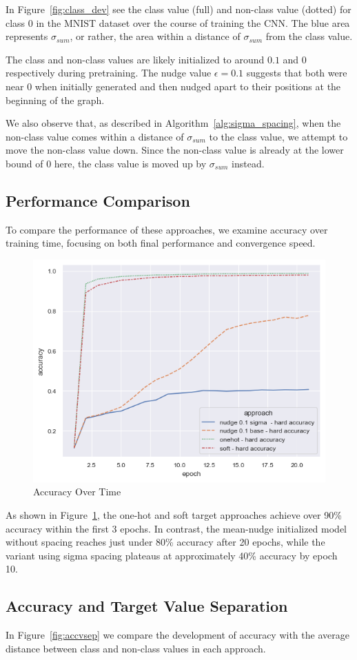 \documentclass[12pt,fleqn,a4paper]{article}
\begin{document}
In Figure~\ref{fig:class_dev} see the class value (full) and non-class value (dotted) for class 0 in the MNIST dataset over the course of training the CNN. The blue area represents $\sigma_{sum}$, or rather, the area within a distance of $\sigma_{sum}$ from the class value. 

The class and non-class values are likely initialized to around $0.1$ and $0$ respectively during pretraining. The nudge value $\epsilon = 0.1$ suggests that both were near $0$ when initially generated and then nudged apart to their positions at the beginning of the graph.

We also observe that, as described in Algorithm~\ref{alg:sigma_spacing}, when the non-class value comes within a distance of $\sigma_{sum}$ to the class value, we attempt to move the non-class value down. Since the non-class value is already at the lower bound of $0$ here, the class value is moved up by  $\sigma_{sum}$ instead.

\subsection{Performance Comparison}
To compare the performance of these approaches, we examine accuracy over training time, focusing on both final performance and convergence speed.
\begin{figure}
    \centering
    \includegraphics[width=0.6\linewidth]{graphs/acc.png}
    \caption{Accuracy Over Time}
    \label{fig:acc}
\end{figure}

As shown in Figure~\ref{fig:acc}, the one-hot and soft target approaches achieve over 90\% accuracy within the first 3 epochs. In contrast, the mean-nudge initialized model without spacing reaches just under 80\% accuracy after 20 epochs, while the variant using sigma spacing plateaus at approximately 40\% accuracy by epoch 10.
\subsection{Accuracy and Target Value Separation}
In Figure~\ref{fig:accvsep} we compare the development of accuracy with the average distance between class and non-class values in each approach.
\end{document}
